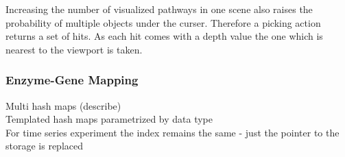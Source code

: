 Increasing the number of visualized pathways in one scene also raises the probability of multiple objects under the curser. Therefore a picking action returns a set of hits. As each hit comes with a depth value the one which is nearest to the viewport is taken.

\subsubsection{Enzyme-Gene Mapping}

Multi hash maps (describe)\\
Templated hash maps parametrized by data type\\
For time series experiment the index remains the same - just the pointer to the storage is replaced\\